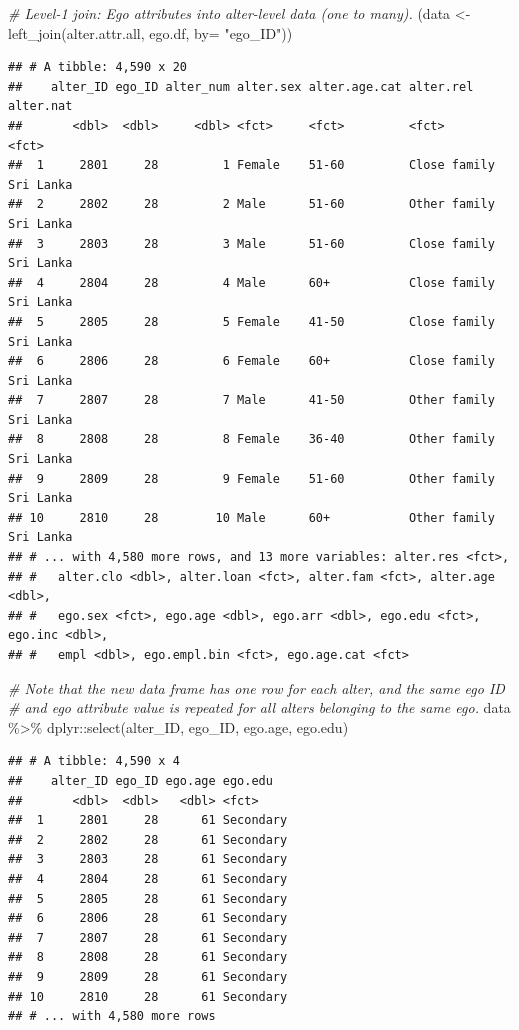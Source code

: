 \documentclass[
]{book}
\newenvironment{Shaded}{\begin{snugshade}}{\end{snugshade}}
\newcommand{\AttributeTok}[1]{\textcolor[rgb]{0.77,0.63,0.00}{#1}}
\newcommand{\CommentTok}[1]{\textcolor[rgb]{0.56,0.35,0.01}{\textit{#1}}}
\newcommand{\FunctionTok}[1]{\textcolor[rgb]{0.00,0.00,0.00}{#1}}
\newcommand{\NormalTok}[1]{#1}
\newcommand{\OtherTok}[1]{\textcolor[rgb]{0.56,0.35,0.01}{#1}}
\newcommand{\SpecialCharTok}[1]{\textcolor[rgb]{0.00,0.00,0.00}{#1}}
\newcommand{\StringTok}[1]{\textcolor[rgb]{0.31,0.60,0.02}{#1}}
\begin{document}
\begin{Shaded}
\begin{Highlighting}[]
\CommentTok{\# Level{-}1 join: Ego attributes into alter{-}level data (one to many).}
\NormalTok{(data }\OtherTok{\textless{}{-}} \FunctionTok{left\_join}\NormalTok{(alter.attr.all, ego.df, }\AttributeTok{by=} \StringTok{"ego\_ID"}\NormalTok{))}
\end{Highlighting}
\end{Shaded}

\begin{verbatim}
## # A tibble: 4,590 x 20
##    alter_ID ego_ID alter_num alter.sex alter.age.cat alter.rel    alter.nat
##       <dbl>  <dbl>     <dbl> <fct>     <fct>         <fct>        <fct>    
##  1     2801     28         1 Female    51-60         Close family Sri Lanka
##  2     2802     28         2 Male      51-60         Other family Sri Lanka
##  3     2803     28         3 Male      51-60         Close family Sri Lanka
##  4     2804     28         4 Male      60+           Close family Sri Lanka
##  5     2805     28         5 Female    41-50         Close family Sri Lanka
##  6     2806     28         6 Female    60+           Close family Sri Lanka
##  7     2807     28         7 Male      41-50         Other family Sri Lanka
##  8     2808     28         8 Female    36-40         Other family Sri Lanka
##  9     2809     28         9 Female    51-60         Other family Sri Lanka
## 10     2810     28        10 Male      60+           Other family Sri Lanka
## # ... with 4,580 more rows, and 13 more variables: alter.res <fct>,
## #   alter.clo <dbl>, alter.loan <fct>, alter.fam <fct>, alter.age <dbl>,
## #   ego.sex <fct>, ego.age <dbl>, ego.arr <dbl>, ego.edu <fct>, ego.inc <dbl>,
## #   empl <dbl>, ego.empl.bin <fct>, ego.age.cat <fct>
\end{verbatim}

\begin{Shaded}
\begin{Highlighting}[]
\CommentTok{\# Note that the new data frame has one row for each alter, and the same ego ID}
\CommentTok{\# and ego attribute value is repeated for all alters belonging to the same ego.}
\NormalTok{data }\SpecialCharTok{\%\textgreater{}\%} 
\NormalTok{  dplyr}\SpecialCharTok{::}\FunctionTok{select}\NormalTok{(alter\_ID, ego\_ID, ego.age, ego.edu)}
\end{Highlighting}
\end{Shaded}

\begin{verbatim}
## # A tibble: 4,590 x 4
##    alter_ID ego_ID ego.age ego.edu  
##       <dbl>  <dbl>   <dbl> <fct>    
##  1     2801     28      61 Secondary
##  2     2802     28      61 Secondary
##  3     2803     28      61 Secondary
##  4     2804     28      61 Secondary
##  5     2805     28      61 Secondary
##  6     2806     28      61 Secondary
##  7     2807     28      61 Secondary
##  8     2808     28      61 Secondary
##  9     2809     28      61 Secondary
## 10     2810     28      61 Secondary
## # ... with 4,580 more rows
\end{verbatim}
\end{document}
